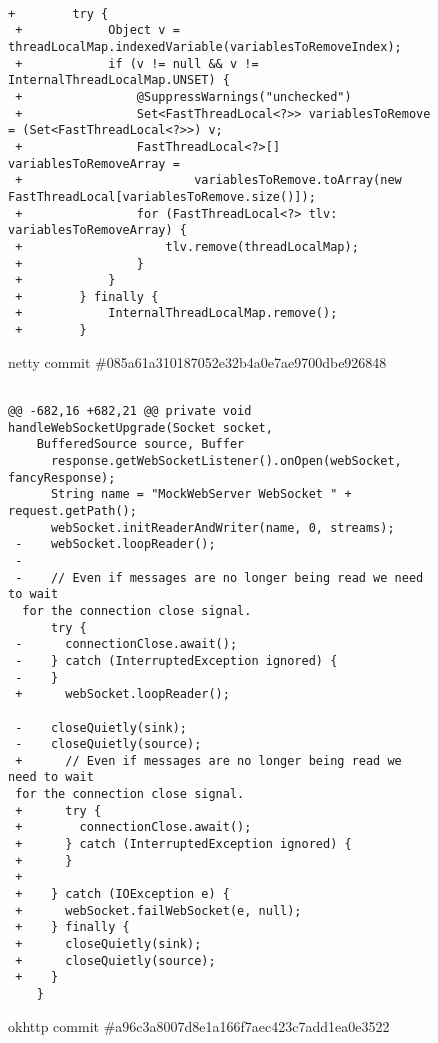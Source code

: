 \begin{figure*}
\begin{lstlisting}

+        try {
 +            Object v = threadLocalMap.indexedVariable(variablesToRemoveIndex);
 +            if (v != null && v != InternalThreadLocalMap.UNSET) {
 +                @SuppressWarnings("unchecked")
 +                Set<FastThreadLocal<?>> variablesToRemove = (Set<FastThreadLocal<?>>) v;
 +                FastThreadLocal<?>[] variablesToRemoveArray =
 +                        variablesToRemove.toArray(new FastThreadLocal[variablesToRemove.size()]);
 +                for (FastThreadLocal<?> tlv: variablesToRemoveArray) {
 +                    tlv.remove(threadLocalMap);
 +                }
 +            }
 +        } finally {
 +            InternalThreadLocalMap.remove();
 +        }
 \end{lstlisting}
\caption{netty commit \#085a61a310187052e32b4a0e7ae9700dbe926848\label{fig:thread1}}
\end{figure*}


\begin{figure*}
\begin{lstlisting}

@@ -682,16 +682,21 @@ private void handleWebSocketUpgrade(Socket socket, 
    BufferedSource source, Buffer
      response.getWebSocketListener().onOpen(webSocket, fancyResponse);
      String name = "MockWebServer WebSocket " + request.getPath();
      webSocket.initReaderAndWriter(name, 0, streams);
 -    webSocket.loopReader();
 -
 -    // Even if messages are no longer being read we need to wait
  for the connection close signal.
      try {
 -      connectionClose.await();
 -    } catch (InterruptedException ignored) {
 -    }
 +      webSocket.loopReader();
  
 -    closeQuietly(sink);
 -    closeQuietly(source);
 +      // Even if messages are no longer being read we need to wait 
 for the connection close signal.
 +      try {
 +        connectionClose.await();
 +      } catch (InterruptedException ignored) {
 +      }
 +
 +    } catch (IOException e) {
 +      webSocket.failWebSocket(e, null);
 +    } finally {
 +      closeQuietly(sink);
 +      closeQuietly(source);
 +    }
    }
\end{lstlisting}
\caption{okhttp commit \#a96c3a8007d8e1a166f7aec423c7add1ea0e3522\label{fig:thread2}}
\end{figure*}


